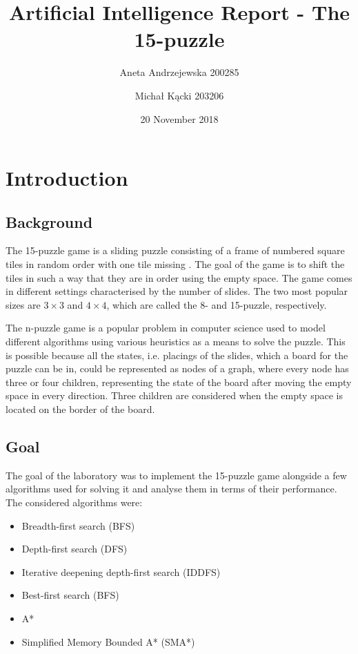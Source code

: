\documentclass[12pt]{article}
\title{Artificial Intelligence Report - The 15-puzzle}
\author{Aneta Andrzejewska 200285 \and Michał Kącki 203206}
\date{20 November 2018}
\begin{document}

\maketitle
\newpage

\tableofcontents
\newpage

\setcounter{page}{3}

\section{Introduction}
\subsection{Background}

The 15-puzzle game is a sliding puzzle consisting of a frame of numbered square tiles in random order with one tile missing \cite{15-puzzle}. The goal of the game is to shift the tiles in such a way that they are in order using the empty space. The game comes in different settings characterised by the number of slides. The two most popular sizes are $3\times3$ and $4\times4$, which are called the 8- and 15-puzzle, respectively.

The n-puzzle game is a popular problem in computer science used to model different algorithms using various heuristics as a means to solve the puzzle. This is possible because all the states, i.e. placings of the slides, which a board for the puzzle can be in, could be represented as nodes of a graph, where every node has three or four children, representing the state of the board after moving the empty space in every direction. Three children are considered when the empty space is located on the border of the board.

\subsection{Goal}

The goal of the laboratory was to implement the 15-puzzle game alongside a few algorithms used for solving it and analyse them in terms of their performance. The considered algorithms were:

\begin{itemize}
    \item Breadth-first search (BFS)
    \item Depth-first search (DFS)
    \item Iterative deepening depth-first search (IDDFS)
    \item Best-first search (BFS)
    \item A*
    \item Simplified Memory Bounded A* (SMA*)
\end{itemize}
\end{document}
